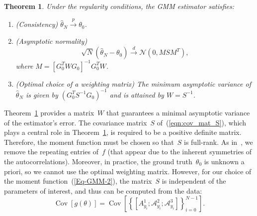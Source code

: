 \documentclass{article}
\newtheorem{theorem}[assumption]{Theorem}%
\newcommand{\A}[0]{\mathcal{A}}
\newcommand{\Cov}[0]{\operatorname{Cov}}
\begin{document}
\begin{theorem}\label{Thm-2-6}
	Under {the} regularity conditions, the GMM estimator satisfies:
	\begin{enumerate}[label={\Alph*}.]
		\item  \label{Thm-2-2}
		\textnormal{(Consistency)} $\hat{\theta}_N \overset{p}{\to} \theta_0$.

		\item \label{Thm-2-3} \textnormal{(Asymptotic normality)}
		\[\sqrt{N} ( \hat{\theta}_N - \theta_0) \overset{d}{\to} \mathcal{N}(0, M S M^T ),\] where $M =[G_0^T W  G_0]^{-1} G_0^T  W$.

		\item \label{Thm-2-5} \textnormal{(Optimal choice of a weighting matrix)} The minimum asymptotic variance of $\hat{\theta}_N$ is given by $(G_0^T S^{-1} G_0)^{-1}$ and is attained by $W = S^{-1}$.
	\end{enumerate}
\end{theorem}
Theorem~\ref{Thm-2-6} provides a matrix~$W$ {that} guarantees a minimal asymptotic variance of the estimator’s error. The covariance matrix~$S$ {of~(\ref{eqn:cov_mat_S}), which plays a central role in Theorem~\ref{Thm-2-6},} is required to be a positive definite matrix. Therefore, the moment function must be chosen so that~$S$ is full-rank. As in~\cite{abas2021generalized},  we remove the repeating entries of~$f$ (that appear due to the inherent symmetries of the autocorrelations). Moreover, in practice, the ground truth~$\theta_0$ is unknown a priori, so we cannot use the optimal weighting matrix. However, for our choice of the moment function~(\ref{Eq-GMM-2}), the matrix~$S$ is independent of the parameters of interest, and thus can be computed from the data:
	\begin{equation}\label{Eq-2-7}
		\Cov[g(\theta)] = \Cov\left[\left\{[A_{y_i}^1;\A_{y_i}^2;\A_{y_i}^3]\right\}_{i = 0}^{N - 1}\right].
	\end{equation}
\end{document}
